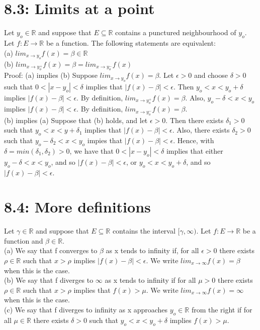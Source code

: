 \documentclass[10pt,letter]{report}
\begin{document}
\section*{8.3: Limits at a point}
Let $y_o \in\mathbb{R}$ and suppose that $E \subseteq\mathbb{R}$ contains a punctured neighbourhood of $y_o$. Let $f: E\rightarrow\mathbb{R}$ be a function. The following statements are equivalent: \\ 
(a) $lim_{x\rightarrow y_o}f(x) = \beta \in \mathbb{R}$\\ 
(b) $lim_{x\rightarrow y_o^+}f(x) = \beta = lim_{x\rightarrow y_o^-}f(x)$\\ 
Proof: (a) implies (b) Suppose $lim_{x\rightarrow y_o}f(x) = \beta$. Let $\epsilon > 0$ and choose $\delta > 0$ such that $0 < |x-y_o| < \delta$ implies that $|f(x)-\beta|<\epsilon$. Then $y_o<x<y_o+\delta$ implies $|f(x)-\beta|<\epsilon$. By definition, $lim_{x\rightarrow y_o^+}f(x)=\beta$. Also, $y_o-\delta<x<y_o$ implies $|f(x)-\beta|<\epsilon$. By definition, $lim_{x\rightarrow y_o^-}f(x) = \beta$. \\ 
(b) implies (a) Suppose that (b) holds, and let $\epsilon > 0$. Then there exists $\delta_1>0$ such that $y_o<x<y+\delta_1$ implies that $|f(x)-\beta|<\epsilon$. Also, there exists $\delta_2 > 0$ such that $y_o-\delta_2 < x< y_o$ impies that $|f(x)-\beta|<\epsilon$. Hence, with $\delta = min(\delta_1, \delta_2)>0$, we have that $0 < |x-y_o|<\delta$ implies that either $y_o-\delta<x<y_o$, and so $|f(x)-\beta|<\epsilon$, or $y_o<x<y_o+\delta$, and so $|f(x)-\beta|<\epsilon$. 

\section*{8.4: More definitions}
Let $\gamma\in\mathbb{R}$ and suppose that $E\subseteq\mathbb{R}$ contains the interval $[\gamma,\infty)$. Let $f:E\rightarrow\mathbb{R}$ be a function and $\beta\in\mathbb{R}$. \\ 
(a) We say that f converges to $\beta$ as x tends to infinity if, for all $\epsilon >0$ there exists $\rho\in\mathbb{R}$ such that $x>\rho$ implies $|f(x)-\beta|<\epsilon$. We write $lim_{x\rightarrow\infty}f(x)=\beta$ when this is the case. \\ 
(b) We say that f diverges to $\infty$ as x tends to infinity if for all $\mu > 0$ there exists $\rho\in\mathbb{R}$ such that $x>\rho$ implies that $f(x)>\mu$. We write $lim_{x\rightarrow\infty}f(x) = \infty$ when this is the case.\\ 
(c) We say that f diverges to infinity as x approaches $y_o\in\mathbb{R}$ from the right if for all $\mu\in\mathbb{R}$ there exists $\delta>0$ such that $y_o<x<y_o+\delta$ implies $f(x)>\mu$. 
\end{document}
